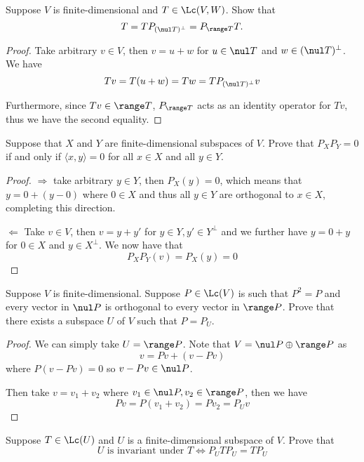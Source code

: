 \documentclass{extarticle}
\begin{document}
\begin{problem}{6}
    Suppose \(V\) is finite-dimensional and \(T \in \Lc(V, W)\). Show that 
    \[T = TP_{(\nul T)^\perp} = P_{\range T}T.\]
\end{problem}

\begin{proof}
Take arbitrary \(v \in V\), then \(v = u + w\) for \(u \in \nul T\) and \(w \in (\nul T)^\perp\). We have 
\[Tv = T(u + w) = Tw = T P_{(\nul T)^\perp}v\]

Furthermore, since \(Tv \in \range T\), \(P_{\range T}\) acts as an identity operator for \(Tv\), thus 
we have the second equality.
\end{proof}

\begin{problem}{7}
    Suppose that \(X\) and \(Y\) are finite-dimensional subspaces of \(V\). Prove that 
    \(P_XP_Y = 0\) if and only if \(\langle x,y \rangle = 0\) for all \(x \in X\) and all \(y \in Y\).
\end{problem}

\begin{proof}
\(\Rightarrow\) take arbitrary \(y \in Y\), then \(P_X (y) = 0\), which means that \(y = 0 + (y - 0)\) where 
\(0 \in X\) and thus all \(y \in Y\) are orthogonal to \(x \in X\), completing this direction. 

\(\Leftarrow\) Take \(v \in V\), then \(v = y + y'\) for \(y \in Y, y' \in Y^\perp\) and we further have 
\(y = 0 + y\) for \(0 \in X\) and \(y \in X^\perp\). We now have that 
\[P_XP_Y(v) = P_X(y)  = 0\] 
\end{proof}

\begin{problem}{9}
    Suppose \(V\) is finite-dimensional. Suppose \(P \in \Lc(V)\) is such that \(P^2 = P\) and 
    every vector in \(\nul P\) is orthogonal to every vector in \(\range P\). Prove that there 
    exists a subspace \(U\) of \(V\) such that \(P = P_{U}\).
\end{problem}

\begin{proof}
We can simply take \(U = \range P\). Note that \(V = \nul P \oplus \range P\) as 
\[v = Pv + (v - Pv)\]
where \(P(v - Pv) = 0\) so \(v - Pv \in \nul P\). 

Then take \(v = v_1 + v_2\) where \(v_1 \in \nul P, v_2 \in \range P\), then we have 
\[Pv = P(v_1 + v_2) = Pv_2 = P_U v \] 
\end{proof}

\begin{problem}{11}
    Suppose \(T \in \Lc(U)\) and \(U\) is a finite-dimensional subspace of \(V\). Prove that 
    \[U \text{ is invariant under } T \Longleftrightarrow P_U T P_U = T P_U\]
\end{problem}
\end{document}
